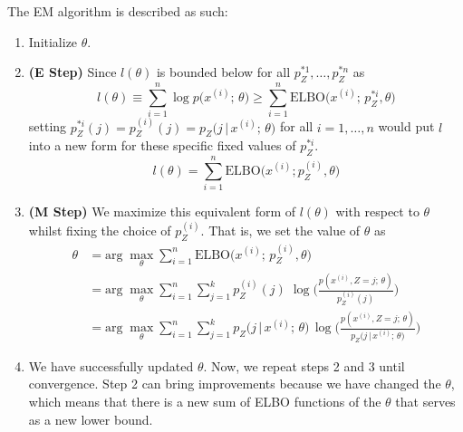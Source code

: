 \begin{definition}
        The EM algorithm is described as such: 
        \begin{enumerate}
          \item Initialize $\theta$.
          \item \textbf{(E Step)} Since $l(\theta)$ is bounded below for all $p_Z^{*1}, \ldots, p_Z^{*n}$ as 
            \[l(\theta) \equiv \sum_{i=1}^n \log p\big( x^{(i)}; \, \theta\big) \geq \sum_{i=1}^n \text{ELBO}\big( x^{(i)}; \, p_Z^{*i}, \theta\big)\]
          setting $p_Z^{*i} (j) = p_Z^{(i)} (j) = p_Z \big(j\,|\, x^{(i)}; \, \theta\big)$ for all $i = 1, \ldots, n$ would put $l$ into a new form for these specific fixed values of $p_Z^{*i}$. 
            \[l(\theta) = \sum_{i=1}^n \text{ELBO}\big(x^{(i)}; p_Z^{(i)}, \theta \big)\]
          \item \textbf{(M Step)} We maximize this equivalent form of $l(\theta)$ with respect to $\theta$ whilst fixing the choice of $p_Z^{(i)}$. That is, we set the value of $\theta$ as 
          \begin{align*}  
            \theta & = \text{arg}\; \max_\theta \sum_{i=1}^n \text{ELBO} \big( x^{(i)}; \, p_Z^{(i)}, \theta \big) \\
            & = \text{arg}\; \max_\theta \sum_{i=1}^n \sum_{j=1}^k p_Z^{(i)} (j)\; \log \bigg( \frac{p(x^{(i)}, Z = j; \, \theta)}{p_Z^{(i)} (j)} \bigg) \\
            & = \text{arg}\; \max_\theta \sum_{i=1}^n \sum_{j = 1}^k p_Z \big(j\,|\, x^{(i)}; \, \theta \big)\, \log \bigg( \frac{p(x^{(i)}, Z = j; \, \theta)}{p_Z \big(j\,|\, x^{(i)}; \, \theta \big)} \bigg)
          \end{align*}
          \item We have successfully updated $\theta$. Now, we repeat steps 2 and 3 until convergence. Step 2 can bring improvements because we have changed the $\theta$, which means that there is a new sum of ELBO functions of the $\theta$ that serves as a new lower bound.
        \end{enumerate}
      \end{definition}

